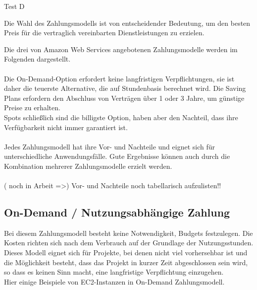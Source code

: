 Test D

Die Wahl des Zahlungsmodells ist von entscheidender Bedeutung, um den besten Preis für die vertraglich vereinbarten Dienstleistungen zu erzielen.

Die drei von Amazon Web Services angebotenen Zahlungsmodelle werden im Folgenden dargestellt.
\\\\
Die On-Demand-Option erfordert keine langfristigen Verpflichtungen, sie ist daher die teuerste Alternative, die auf Stundenbasis berechnet wird. Die Saving Plans erfordern den Abschluss von Verträgen über 1 oder 3 Jahre, um günstige Preise zu erhalten.
\\Spots schließlich sind die billigste Option, haben aber den Nachteil, dass ihre Verfügbarkeit nicht immer garantiert ist.
\\\\
Jedes Zahlungsmodell hat ihre Vor- und Nachteile und eignet sich für unterschiedliche Anwendungsfälle. Gute Ergebnisse können auch durch die Kombination mehrerer Zahlungsmodelle erzielt werden.
\\\\
( noch in Arbeit =>)
Vor- und Nachteile noch tabellarisch aufzulisten!!


\subsection{On-Demand / Nutzungsabhängige Zahlung}
Bei diesem Zahlungsmodell besteht keine Notwendigkeit, Budgets festzulegen. Die Kosten richten sich nach dem Verbrauch auf der Grundlage der Nutzungsstunden.
\\
Dieses Modell eignet sich für Projekte, bei denen nicht viel vorhersehbar ist und die Möglichkeit besteht, dass das Projekt in kurzer Zeit abgeschlossen sein wird, so dass es keinen Sinn macht, eine langfristige Verpflichtung einzugehen.
\\
Hier einige Beispiele von EC2-Instanzen in On-Demand Zahlungsmodell.

